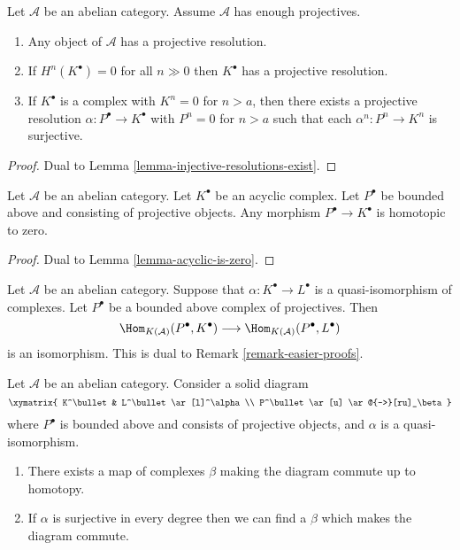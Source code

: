 \begin{lemma}
\label{lemma-projective-resolutions-exist}
Let $\mathcal{A}$ be an abelian category.
Assume $\mathcal{A}$ has enough projectives.
\begin{enumerate}
\item Any object of $\mathcal{A}$ has a projective resolution.
\item If $H^n(K^\bullet) = 0$ for all $n \gg 0$ then
$K^\bullet$ has a projective resolution.
\item If $K^\bullet$ is a complex with $K^n = 0$ for $n > a$, then
there exists a projective resolution $\alpha : P^\bullet \to K^\bullet$
with $P^n = 0$ for $n > a$ such that each $\alpha^n : P^n \to K^n$ is
surjective.
\end{enumerate}
\end{lemma}

\begin{proof}
Dual to
Lemma \ref{lemma-injective-resolutions-exist}.
\end{proof}

\begin{lemma}
\label{lemma-projective-into-acyclic-is-zero}
Let $\mathcal{A}$ be an abelian category.
Let $K^\bullet$ be an acyclic complex.
Let $P^\bullet$ be bounded above and consisting of projective objects.
Any morphism $P^\bullet \to K^\bullet$ is homotopic to zero.
\end{lemma}

\begin{proof}
Dual to
Lemma \ref{lemma-acyclic-is-zero}.
\end{proof}

\begin{remark}
\label{remark-easier-projective}
Let $\mathcal{A}$ be an abelian category.
Suppose that $\alpha : K^\bullet \to L^\bullet$ is a quasi-isomorphism
of complexes. Let $P^\bullet$ be a bounded above complex of projectives.
Then
$$
\Hom_{K(\mathcal{A})}(P^\bullet, K^\bullet)
\longrightarrow
\Hom_{K(\mathcal{A})}(P^\bullet, L^\bullet)
$$
is an isomorphism. This is dual to
Remark \ref{remark-easier-proofs}.
\end{remark}

\begin{lemma}
\label{lemma-morphisms-lift-projective}
Let $\mathcal{A}$ be an abelian category.
Consider a solid diagram
$$
\xymatrix{
K^\bullet & L^\bullet \ar[l]^\alpha \\
P^\bullet \ar[u] \ar@{-->}[ru]_\beta
}
$$
where $P^\bullet$ is bounded above and consists of projective
objects, and $\alpha$ is a quasi-isomorphism.
\begin{enumerate}
\item There exists a map of complexes $\beta$ making the diagram
commute up to homotopy.
\item If $\alpha$ is surjective in every degree
then we can find a $\beta$ which makes the diagram commute.
\end{enumerate}
\end{lemma}

